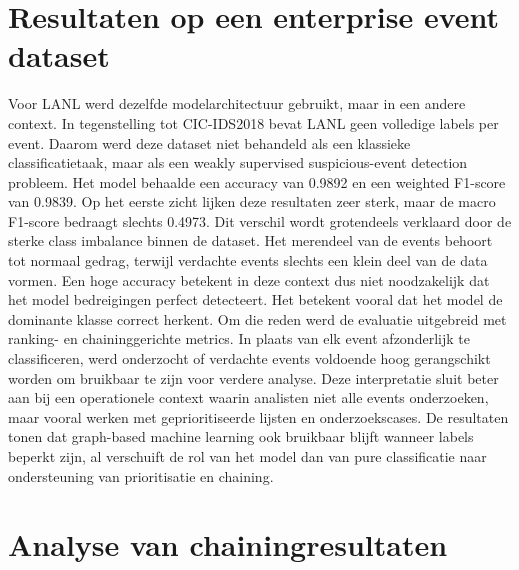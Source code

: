 \section{Resultaten op een enterprise event dataset}

Voor LANL werd dezelfde modelarchitectuur gebruikt, maar in een andere context.
\newline
\newline
In tegenstelling tot CIC-IDS2018 bevat LANL geen volledige labels per event. Daarom werd deze dataset niet behandeld als een klassieke classificatietaak, maar als een weakly supervised suspicious-event detection probleem.
\newline
\newline
Het model behaalde een accuracy van 0.9892 en een weighted F1-score van 0.9839. Op het eerste zicht lijken deze resultaten zeer sterk, maar de macro F1-score bedraagt slechts 0.4973.
\newline
\newline
Dit verschil wordt grotendeels verklaard door de sterke class imbalance binnen de dataset. Het merendeel van de events behoort tot normaal gedrag, terwijl verdachte events slechts een klein deel van de data vormen.
\newline
\newline
Een hoge accuracy betekent in deze context dus niet noodzakelijk dat het model bedreigingen perfect detecteert. Het betekent vooral dat het model de dominante klasse correct herkent.
\newline
\newline
Om die reden werd de evaluatie uitgebreid met ranking- en chaininggerichte metrics. In plaats van elk event afzonderlijk te classificeren, werd onderzocht of verdachte events voldoende hoog gerangschikt worden om bruikbaar te zijn voor verdere analyse.
\newline
\newline
Deze interpretatie sluit beter aan bij een operationele context waarin analisten niet alle events onderzoeken, maar vooral werken met geprioritiseerde lijsten en onderzoekscases.
\newline
\newline
De resultaten tonen dat graph-based machine learning ook bruikbaar blijft wanneer labels beperkt zijn, al verschuift de rol van het model dan van pure classificatie naar ondersteuning van prioritisatie en chaining.

\section{Analyse van chainingresultaten}

